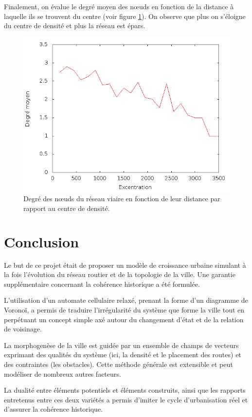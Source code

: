 \documentclass[10pt]{article}
\begin{document}
Finalement, on évalue le degré moyen des n\oe uds en fonction de la
distance à laquelle ils se trouvent du centre (voir figure
\ref{fig:degree_distance}). On observe que plus on s'éloigne du centre
de densité et plus la réseau est épars.

\begin{figure}[H]
  \centering
  \includegraphics[width=.8\linewidth]{images/degree_distance.png}
  \caption{Degré des n\oe uds du réseau viaire en fonction de leur
    distance par rapport au centre de densité.}
  \label{fig:degree_distance}
\end{figure}

\section{Conclusion}

Le but de ce projet était de proposer un modèle de croissance urbaine
simulant à la fois l'évolution du réseau routier et de la topologie de
la ville. Une garantie supplémentaire concernant la cohérence
historique a été formulée.

L'utilisation d'un automate cellulaire relaxé, prenant la forme d'un
diagramme de Voronoï, a permis de traduire l'irrégularité du système
que forme la ville tout en perpétuant un concept simple axé autour du
changement d'état et de la relation de voisinage.

La morphogenèse de la ville est guidée par un ensemble de champs de
vecteurs exprimant des qualités du système (ici, la densité et le
placement des routes) et des contraintes (les obstacles). Cette
méthode générale est extensible et peut modéliser de nombreux autres
facteurs.

La dualité entre éléments potentiels et éléments construits, ainsi que
les rapports entretenus entre ces deux variétés a permis d'imiter le
cycle d'urbanisation réel et d'assurer la cohérence historique.
\end{document}
